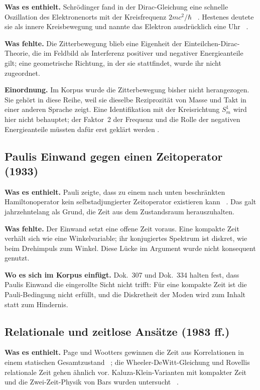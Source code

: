 \textbf{Was es enthielt.} Schrödinger fand in der Dirac-Gleichung eine schnelle Oszillation des
Elektronenorts mit der Kreisfrequenz $2mc^2/\hbar$ \QM~\cite{Schroedinger1930}. Hestenes deutete
sie als innere Kreisbewegung und nannte das Elektron ausdrücklich eine Uhr
\QM~\cite{Hestenes1990}.

\textbf{Was fehlte.} Die Zitterbewegung blieb eine Eigenheit der Einteilchen-Dirac-Theorie, die im
Feldbild als Interferenz positiver und negativer Energieanteile gilt; eine geometrische Richtung,
in der sie stattfindet, wurde ihr nicht zugeordnet.

\textbf{Einordnung.} Im Korpus wurde die Zitterbewegung bisher nicht herangezogen. Sie gehört in
diese Reihe, weil sie dieselbe Reziprozität von Masse und Takt in einer anderen Sprache zeigt. Eine
Identifikation mit der Kreisrichtung $S^1_m$ wird hier nicht behauptet; der Faktor~2 der Frequenz
und die Rolle der negativen Energieanteile müssten dafür erst geklärt werden \SM.

\subsection{Paulis Einwand gegen einen Zeitoperator (1933)}

\textbf{Was es enthielt.} Pauli zeigte, dass zu einem nach unten beschränkten Hamiltonoperator
kein selbstadjungierter Zeitoperator existieren kann \QM~\cite{Pauli1933}. Das galt jahrzehntelang
als Grund, die Zeit aus dem Zustandsraum herauszuhalten.

\textbf{Was fehlte.} Der Einwand setzt eine offene Zeit voraus. Eine kompakte Zeit verhält sich wie
eine Winkelvariable; ihr konjugiertes Spektrum ist diskret, wie beim Drehimpuls zum Winkel. Diese
Lücke im Argument wurde nicht konsequent genutzt.

\textbf{Wo es sich im Korpus einfügt.} Dok.~307 und Dok.~334 halten fest, dass Paulis Einwand die
eingerollte Sicht nicht trifft: Für eine kompakte Zeit ist die Pauli-Bedingung nicht erfüllt, und
die Diskretheit der Moden wird zum Inhalt statt zum Hindernis.

\subsection{Relationale und zeitlose Ansätze (1983 ff.)}

\textbf{Was es enthielt.} Page und Wootters gewinnen die Zeit aus Korrelationen in einem statischen
Gesamtzustand \QM~\cite{PageWootters1983}; die Wheeler-DeWitt-Gleichung und Rovellis relationale
Zeit gehen ähnlich vor. Kaluza-Klein-Varianten mit kompakter Zeit und die Zwei-Zeit-Physik von Bars
wurden untersucht \QM~\cite{Bars2001}.


